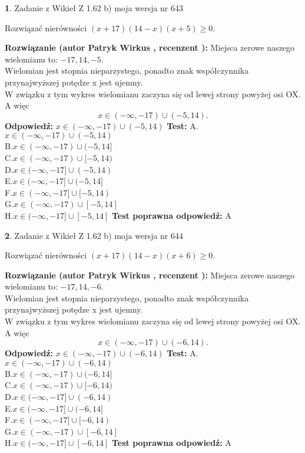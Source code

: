 \documentclass[12pt, a4paper]{article}
\theoremstyle{definition} %
\newtheorem{zad}{}
\newcommand{\zadStart}[1]{\begin{zad}#1\newline}
\newcommand{\zadStop}{\end{zad}}
\newcommand{\rozwStart}[2]{\noindent \textbf{Rozwiązanie (autor #1 , recenzent #2): }\newline}
\newcommand{\rozwStop}{\newline}
\newcommand{\odpStart}{\noindent \textbf{Odpowiedź:}\newline}
\newcommand{\odpStop}{\newline}
\newcommand{\testStart}{\noindent \textbf{Test:}\newline}
\newcommand{\testStop}{\newline}
\newcommand{\kluczStart}{\noindent \textbf{Test poprawna odpowiedź:}\newline}
\newcommand{\kluczStop}{\newline}
\begin{document}
\zadStart{Zadanie z Wikieł Z 1.62 b) moja wersja nr 643}

Rozwiązać nierówności $(x+17)(14-x)(x+5)\ge0$.
\zadStop
\rozwStart{Patryk Wirkus}{}
Miejsca zerowe naszego wielomianu to: $-17, 14, -5$.\\
Wielomian jest stopnia nieparzystego, ponadto znak współczynnika przy\linebreak najwyższej potędze x jest ujemny.\\ W związku z tym wykres wielomianu zaczyna się od lewej strony powyżej osi OX. A więc $$x \in (-\infty,-17) \cup (-5,14).$$
\rozwStop
\odpStart
$x \in (-\infty,-17) \cup (-5,14)$
\odpStop
\testStart
A.$x \in (-\infty,-17) \cup (-5,14)$\\
B.$x \in (-\infty,-17) \cup (-5,14]$\\
C.$x \in (-\infty,-17) \cup [-5,14)$\\
D.$x \in (-\infty,-17] \cup (-5,14)$\\
E.$x \in (-\infty,-17] \cup (-5,14]$\\
F.$x \in (-\infty,-17] \cup [-5,14)$\\
G.$x \in (-\infty,-17) \cup [-5,14]$\\
H.$x \in (-\infty,-17] \cup [-5,14]$
\testStop
\kluczStart
A
\kluczStop



\zadStart{Zadanie z Wikieł Z 1.62 b) moja wersja nr 644}

Rozwiązać nierówności $(x+17)(14-x)(x+6)\ge0$.
\zadStop
\rozwStart{Patryk Wirkus}{}
Miejsca zerowe naszego wielomianu to: $-17, 14, -6$.\\
Wielomian jest stopnia nieparzystego, ponadto znak współczynnika przy\linebreak najwyższej potędze x jest ujemny.\\ W związku z tym wykres wielomianu zaczyna się od lewej strony powyżej osi OX. A więc $$x \in (-\infty,-17) \cup (-6,14).$$
\rozwStop
\odpStart
$x \in (-\infty,-17) \cup (-6,14)$
\odpStop
\testStart
A.$x \in (-\infty,-17) \cup (-6,14)$\\
B.$x \in (-\infty,-17) \cup (-6,14]$\\
C.$x \in (-\infty,-17) \cup [-6,14)$\\
D.$x \in (-\infty,-17] \cup (-6,14)$\\
E.$x \in (-\infty,-17] \cup (-6,14]$\\
F.$x \in (-\infty,-17] \cup [-6,14)$\\
G.$x \in (-\infty,-17) \cup [-6,14]$\\
H.$x \in (-\infty,-17] \cup [-6,14]$
\testStop
\kluczStart
A
\kluczStop
\end{document}

